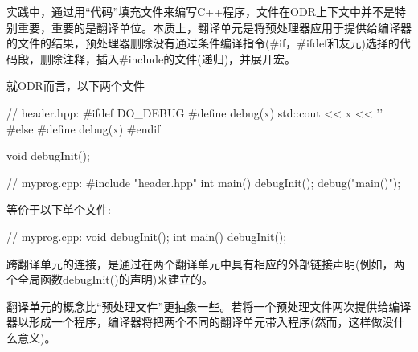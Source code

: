 实践中，通过用“代码”填充文件来编写C++程序，文件在ODR上下文中并不是特别重要，重要的是翻译单位。本质上，翻译单元是将预处理器应用于提供给编译器的文件的结果，预处理器删除没有通过条件编译指令(\#if，\#ifdef和友元)选择的代码段，删除注释，插入\#include的文件(递归)，并展开宏。

就ODR而言，以下两个文件

\begin{cpp}
// header.hpp:
#ifdef DO_DEBUG
#define debug(x) std::cout << x << ’\n’
#else
#define debug(x)
#endif

void debugInit();

// myprog.cpp:
#include "header.hpp"
int main()
{
	debugInit();
	debug("main()");
}
\end{cpp}

等价于以下单个文件:

\begin{cpp}
// myprog.cpp:
void debugInit();
int main()
{
	debugInit();
}
\end{cpp}

跨翻译单元的连接，是通过在两个翻译单元中具有相应的外部链接声明(例如，两个全局函数debugInit()的声明)来建立的。

翻译单元的概念比“预处理文件”更抽象一些。若将一个预处理文件两次提供给编译器以形成一个程序，编译器将把两个不同的翻译单元带入程序(然而，这样做没什么意义)。









































